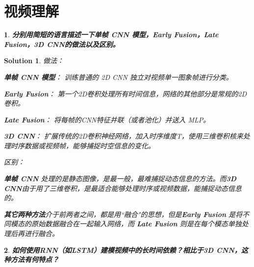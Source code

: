 \documentclass{article}
\title{\Huge\Assignment}
\author{\ID \Name \quad\href{mailto:tianym2022@smail.nju.edu.cn}{\color{magenta}\Email}}
\date{\today}
\theoremstyle{Problem}
\newtheorem{prob}{}
\theoremstyle{Solution}
\newtheorem*{sol}{Solution}
\begin{document}
	\maketitle
	
	\section{视频理解}
	\begin{prob}
		\textbf{分别用简短的语言描述一下单帧 CNN 模型，Early Fusion，Late Fusion，3D CNN的做法以及区别。}
	\end{prob}
	\begin{sol}
		{\color{red} 做法：}
		
		\textbf{单帧 CNN 模型}：  
		训练普通的 2D CNN 独立对视频单一图象帧进行分类。
		
		\textbf{Early Fusion}： 第一个2D卷积处理所有时间信息，网络的其他部分是常规的2D卷积。
		
		\textbf{Late Fusion}： 将每帧的CNN特征并联（或者池化）并送入 MLP。		

		\textbf{3D CNN}：  扩展传统的2D卷积神经网络，加入时序维度T，使用三维卷积核来处理时序数据或视频帧，能够捕捉时空信息的变化。
		
		{\color{red} 区别：}  

			\textbf{单帧 CNN} 处理的是静态图像，是最一般，最难捕捉动态信息的方法。而\textbf{3D CNN}由于用了三维卷积，是最适合能够处理时序或视频数据，能捕捉动态信息的。
			
			\textbf{其它两种方法}介于前两者之间，都是用``融合"的思想，但是\textbf{Early Fusion} 是将不同模态的原始数据融合在一起输入网络，而 \textbf{Late Fusion} 则是在每个模态单独处理后再进行融合。\\
	\end{sol}
	
	
	\begin{prob}
		\textbf{如何使用RNN（如LSTM）建模视频中的长时间依赖？相比于3D CNN，这种方法有何特点？}
	\end{prob}
	
\end{document}
